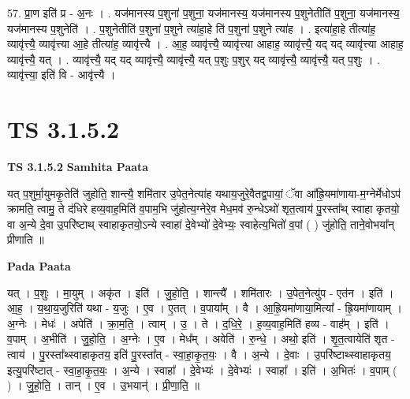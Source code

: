\documentclass[17pt]{extarticle}
\begin{document}
57. प्रा॒ण इति॑ प्र - अ॒नः । . यज॑मानस्य प॒शुना॑ प॒शुना॒ यज॑मानस्य॒ यज॑मानस्य प॒शुनेतीति॑ प॒शुना॒ यज॑मानस्य॒ यज॑मानस्य प॒शुनेति॑ । . प॒शुनेतीति॑ प॒शुना॑ प॒शुने त्या॑हा॒हे ति॑ प॒शुना॑ प॒शुने त्या॑ह । . इत्या॑हा॒हे तीत्या॑ह॒ व्यावृ॑त्त्यै॒ व्यावृ॑त्त्या आ॒हे तीत्या॑ह॒ व्यावृ॑त्त्यै । . आ॒ह॒ व्यावृ॑त्त्यै॒ व्यावृ॑त्त्या आहाह॒ व्यावृ॑त्त्यै॒ यद् यद् व्यावृ॑त्त्या आहाह॒ व्यावृ॑त्त्यै॒ यत् । . व्यावृ॑त्त्यै॒ यद् यद् व्यावृ॑त्त्यै॒ व्यावृ॑त्त्यै॒ यत् प॒शुः प॒शुर् यद् व्यावृ॑त्त्यै॒ व्यावृ॑त्त्यै॒ यत् प॒शुः । . व्यावृ॑त्त्या॒ इति॑ वि - आवृ॑त्त्यै । \newline
\pagebreak
{}

\section{ TS 3.1.5.2 }

\textbf{TS 3.1.5.2 } \newline
\textbf{Samhita Paata} \newline

यत् प॒शुर्मा॒युमकृ॒तेति॑ जुहोति॒ शान्त्यै॒ शमि॑तार उ॒पेत॒नेत्या॑ह यथाय॒जुरे॒वैतद्व॒पायां॒ ॅवा आ᳚ह्रि॒यमा॑णाया-म॒ग्नेर्मेधोऽप॑ क्रामति॒ त्वामु॒ ते द॑धिरे हव्य॒वाह॒मिति॑ व॒पाम॒भि जु॑होत्य॒ग्नेरे॒व मेध॒मव॑ रु॒न्धेऽथो॑ शृत॒त्वाय॑ पु॒रस्ता᳚थ् स्वाहा कृतयो॒ वा अ॒न्ये दे॒वा उ॒परि॑ष्टाथ् स्वाहाकृतयो॒ऽन्ये स्वाहा॑ दे॒वेभ्यो॑ दे॒वेभ्यः॒ स्वाहेत्य॒भितो॑ व॒पां ( ) जु॑होति॒ ताने॒वोभया᳚न् प्रीणाति ॥ \newline

\textbf{Pada Paata} \newline

यत् । प॒शुः । मा॒युम् । अकृ॑त । इति॑ । जु॒हो॒ति॒ । शान्त्यै᳚ । शमि॑तारः । उ॒पेत॒नेत्यु॑प - एत॑न । इति॑ । आ॒ह॒ । य॒था॒य॒जुरिति॑ यथा - य॒जुः । ए॒व । ए॒तत् । व॒पाया᳚म् । वै । आ॒ह्रि॒यमा॑णाया॒मित्या᳚ - ह्रि॒यमा॑णायाम् । अ॒ग्नेः । मेधः॑ । अपेति॑ । क्रा॒म॒ति॒ । त्वाम् । उ॒ । ते । द॒धि॒रे॒ । ह॒व्य॒वाह॒मिति॑ हव्य - वाह᳚म् । इति॑ । व॒पाम् । अ॒भीति॑ । जु॒हो॒ति॒ । अ॒ग्नेः । ए॒व । मेध᳚म् । अवेति॑ । रु॒न्धे॒ । अथो॒ इति॑ । शृ॒त॒त्वायेति॑ शृत - त्वाय॑ । पु॒रस्ता᳚थ्स्वाहाकृतय॒ इति॑ पु॒रस्ता᳚त् - स्वा॒हा॒कृ॒त॒यः॒ । वै । अ॒न्ये । दे॒वाः । उ॒परि॑ष्टाथ्स्वाहाकृतय॒ इत्यु॒परि॑ष्टात् - स्वा॒हा॒कृ॒त॒यः॒ । अ॒न्ये । स्वाहा᳚ । दे॒वेभ्यः॑ । दे॒वेभ्यः॑ । स्वाहा᳚ । इति॑ । अ॒भितः॑ । व॒पाम् ( ) । जु॒हो॒ति॒ । तान् । ए॒व । उ॒भयान्॑ । प्री॒णा॒ति॒ ॥  \newline
\end{document}
